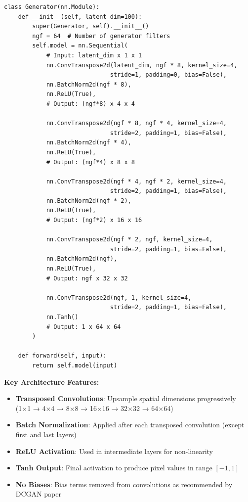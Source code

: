 \documentclass[conference,12pt]{IEEEtran}
\begin{document}
\begin{lstlisting}[caption={Generator Network Implementation}]
class Generator(nn.Module):
    def __init__(self, latent_dim=100):
        super(Generator, self).__init__()
        ngf = 64  # Number of generator filters
        self.model = nn.Sequential(
            # Input: latent_dim x 1 x 1
            nn.ConvTranspose2d(latent_dim, ngf * 8, kernel_size=4, 
                              stride=1, padding=0, bias=False),
            nn.BatchNorm2d(ngf * 8),
            nn.ReLU(True),
            # Output: (ngf*8) x 4 x 4

            nn.ConvTranspose2d(ngf * 8, ngf * 4, kernel_size=4, 
                              stride=2, padding=1, bias=False),
            nn.BatchNorm2d(ngf * 4),
            nn.ReLU(True),
            # Output: (ngf*4) x 8 x 8

            nn.ConvTranspose2d(ngf * 4, ngf * 2, kernel_size=4, 
                              stride=2, padding=1, bias=False),
            nn.BatchNorm2d(ngf * 2),
            nn.ReLU(True),
            # Output: (ngf*2) x 16 x 16

            nn.ConvTranspose2d(ngf * 2, ngf, kernel_size=4, 
                              stride=2, padding=1, bias=False),
            nn.BatchNorm2d(ngf),
            nn.ReLU(True),
            # Output: ngf x 32 x 32

            nn.ConvTranspose2d(ngf, 1, kernel_size=4, 
                              stride=2, padding=1, bias=False),
            nn.Tanh()
            # Output: 1 x 64 x 64
        )

    def forward(self, input):
        return self.model(input)
\end{lstlisting}

\textbf{Key Architecture Features:}
\begin{itemize}
    \item \textbf{Transposed Convolutions}: Upsample spatial dimensions progressively (1×1 → 4×4 → 8×8 → 16×16 → 32×32 → 64×64)
    \item \textbf{Batch Normalization}: Applied after each transposed convolution (except first and last layers)
    \item \textbf{ReLU Activation}: Used in intermediate layers for non-linearity
    \item \textbf{Tanh Output}: Final activation to produce pixel values in range $[-1, 1]$
    \item \textbf{No Biases}: Bias terms removed from convolutions as recommended by DCGAN paper
\end{itemize}
\end{document}
